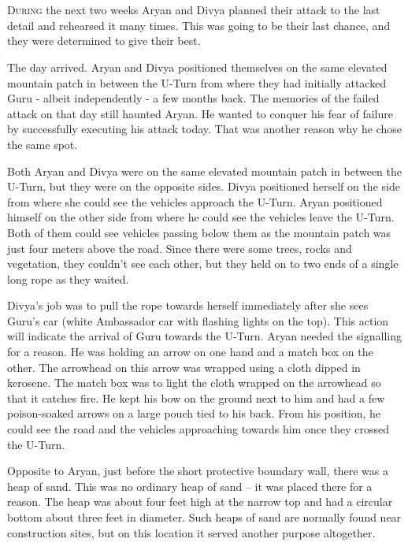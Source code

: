 \chapter{}

\lettrine{D}{uring} the next two weeks Aryan and Divya planned their attack to the last
detail and rehearsed it many times. This was going to be their last chance, and
they were determined to give their best.

The day arrived. Aryan and Divya positioned themselves on the same elevated
mountain patch in between the U-Turn from where they had initially attacked Guru
- albeit independently - a few months back. The memories of the failed attack on
that day still haunted Aryan. He wanted to conquer his fear of failure by
successfully executing his attack today. That was another reason why he chose
the same spot.

Both Aryan and Divya were on the same elevated mountain patch in between the
U-Turn, but they were on the opposite sides. Divya positioned herself on the
side from where she could see the vehicles approach the U-Turn. Aryan positioned
himself on the other side from where he could see the vehicles leave the U-Turn.
Both of them could see vehicles passing below them as the mountain patch was
just four meters above the road. Since there were some trees, rocks and
vegetation, they couldn't see each other, but they held on to two ends of a
single long rope as they waited.

Divya's job was to pull the rope towards herself immediately after she sees
Guru's car (white Ambassador car with flashing lights on the top). This action
will indicate the arrival of Guru towards the U-Turn. Aryan needed the signalling
for a reason. He was holding an arrow on one hand and a match box on the other.
The arrowhead on this arrow was wrapped using a cloth dipped in kerosene. The
match box was to light the cloth wrapped on the arrowhead so that it catches
fire. He kept his bow on the ground next to him and had a few poison-soaked
arrows on a large pouch tied to his back. From his position, he could see the
road and the vehicles approaching towards him once they crossed the U-Turn.

Opposite to Aryan, just before the short protective boundary wall, there was a
heap of sand. This was no ordinary heap of sand – it was placed there for a
reason. The heap was about four feet high at the narrow top and had a circular
bottom about three feet in diameter. Such heaps of sand are normally found near
construction sites, but on this location it served another purpose altogether.

